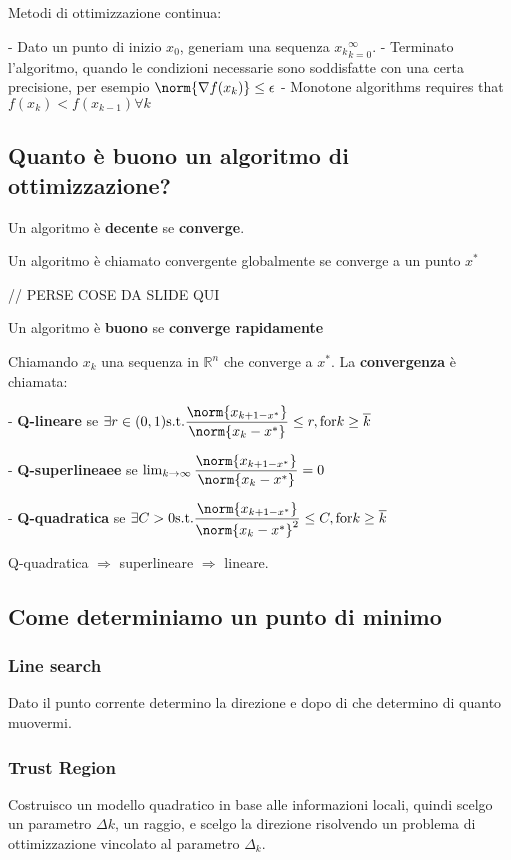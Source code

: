 \documentclass[\main/main.tex]{subfiles}
\begin{document}
Metodi di ottimizzazione continua:

- Dato un punto di inizio $x_0$, generiam una sequenza ${x_k}^\infty_{k=0}$.
- Terminato l'algoritmo, quando le condizioni necessarie sono soddisfatte con una certa precisione, per esempio $\norm{\nabla f(x_k)}\leq \epsilon$
- Monotone algorithms requires that $f(x_k) < f(x_{k-1}) \forall k$

\subsection{Quanto è buono un algoritmo di ottimizzazione?}

Un algoritmo è \textbf{decente} se \textbf{converge}.

\begin{definition}
  Un algoritmo è chiamato convergente globalmente se converge a un punto $x^*$
\end{definition}

// PERSE COSE DA SLIDE QUI

Un algoritmo è \textbf{buono} se \textbf{converge rapidamente}

Chiamando $x_k$ una sequenza in $\mathbb{R}^n$ che converge a $x^*$. La \textbf{convergenza} è chiamata:

- \textbf{Q-lineare} se $\exists r \in (0,1) \text{s.t.} \dfrac{\norm{x_{k+1-x^*}}}{\norm{x_k - x^*}} \leq r, \text{for} k \geq \overline{k}$

- \textbf{Q-superlineaee} se $\lim_{k\rightarrow \infty} \dfrac{\norm{x_{k+1-x^*}}}{\norm{x_k - x^*}} = 0$

- \textbf{Q-quadratica} se $\exists C > 0 \text{s.t.} \dfrac{\norm{x_{k+1-x^*}}}{\norm{x_k - x^*}^2} \leq C, \text{for} k \geq \overline{k}$

Q-quadratica $\Rightarrow$ superlineare  $\Rightarrow$ lineare.


\subsection{Come determiniamo un punto di minimo}

\subsubsection{Line search}
Dato il punto corrente determino la direzione e dopo di che determino di quanto muovermi.

\subsubsection{Trust Region}
Costruisco un modello quadratico in base alle informazioni locali, quindi scelgo un parametro $\Delta k$, un raggio, e scelgo la direzione risolvendo un problema di ottimizzazione vincolato al parametro $\Delta_k$.
\end{document}
